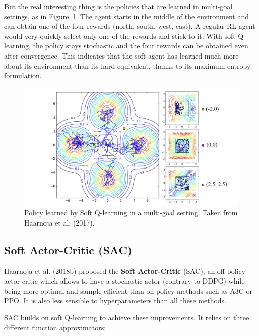 \documentclass[
  letterpaper,
  DIV=11,
  numbers=noendperiod]{scrreprt}
\begin{document}
But the real interesting thing is the policies that are learned in
multi-goal settings, as in Figure~\ref{fig-softql}. The agent starts in
the middle of the environment and can obtain one of the four rewards
(north, south, west, east). A regular RL agent would very quickly select
only one of the rewards and stick to it. With soft Q-learning, the
policy stays stochastic and the four rewards can be obtained even after
convergence. This indicates that the soft agent has learned much more
about its environment than its hard equivalent, thanks to its maximum
entropy formulation.

\begin{figure}

{\centering \includegraphics{./img/softQL.png}

}

\caption{\label{fig-softql}Policy learned by Soft Q-learning in a
multi-goal setting. Taken from Haarnoja et al. (2017).}

\end{figure}

\hypertarget{soft-actor-critic-sac}{%
\subsection{Soft Actor-Critic (SAC)}\label{soft-actor-critic-sac}}

Haarnoja et al. (2018b) proposed the \textbf{Soft Actor-Critic} (SAC),
an off-policy actor-critic which allows to have a stochastic actor
(contrary to DDPG) while being more optimal and sample efficient than
on-policy methods such as A3C or PPO. It is also less sensible to
hyperparameters than all these methods.

SAC builds on soft Q-learning to achieve these improvements. It relies
on three different function approximators:
\end{document}
